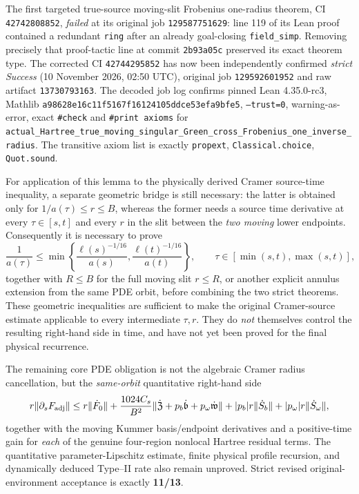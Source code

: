 \documentclass[11pt]{amsart}
\begin{document}
The first targeted true-source moving-slit Frobenius one-radius theorem,
CI \texttt{42742808852}, \emph{failed} at its original job
\texttt{129587751629}: line 119 of its Lean proof contained a
redundant \texttt{ring} after an already goal-closing
\texttt{field\_simp}. Removing precisely that proof-tactic line
at commit \texttt{2b93a05c} preserved its exact theorem type.
The corrected CI \texttt{42744295852} has now been independently
confirmed \emph{strict Success} (10 November 2026, 02:50 UTC),
original job \texttt{129592601952} and raw artifact
\texttt{13730793163}. The decoded job log confirms pinned
Lean 4.35.0-rc3, Mathlib
\texttt{a98628e16c11f5167f16124105ddce53efa9bfe5},
\texttt{--trust=0}, warning-as-error, exact \texttt{\#check}
and \texttt{\#print axioms} for
\texttt{actual\_Hartree\_true\_moving\_singular\_Green\_cross\_Frobenius\_one\_inverse\_radius}.
The transitive axiom list is exactly
\texttt{propext}, \texttt{Classical.choice}, \texttt{Quot.sound}.

For application of this lemma to the physically derived
Cramer source-time inequality, a separate geometric bridge is
still necessary: the latter is obtained only for
\(1/a(\tau)\le r\le B\), whereas the former needs a source
time derivative at every \(\tau\in[s,t]\) and every
\(r\) in the slit between the \emph{two moving} lower endpoints.
Consequently it is necessary to prove
\[
  \frac{1}{a(\tau)}
   \le \min\left\{
        \frac{\ell(s)^{-1/16}}{a(s)},
        \frac{\ell(t)^{-1/16}}{a(t)}
      \right\},\qquad
 \tau\in[\min(s,t),\max(s,t)],
\]
together with \(R\le B\) for the full moving slit
\(r\le R\), or another explicit annulus extension from the
same PDE orbit, before combining the two strict theorems.
These geometric inequalities are sufficient to make the
original Cramer-source estimate applicable to every intermediate
\(\tau,r\). They do \emph{not} themselves control the resulting
right-hand side in time, and have not yet been proved
for the final physical recurrence.

The remaining core PDE obligation is not the algebraic
Cramer radius cancellation, but the \emph{same-orbit} quantitative
right-hand side
\[
 r\|\partial_sF_{\rm adj}\|
 \le r\|\dot F_0\|+
    \frac{1024C_s}{B^2}
     \|\dot{\mathfrak Z}+p_b\dot{\mathfrak b}
       +p_\omega\dot{\mathfrak w}\|
   +|p_b|r\|\dot S_b\|+|p_\omega|r\|\dot S_\omega\|,
\]
together with the moving Kummer basis/endpoint derivatives and a
positive-time gain for \emph{each} of the genuine four-region nonlocal
Hartree residual terms. The quantitative parameter-Lipschitz estimate,
finite physical profile recursion, and dynamically deduced Type--II
rate also remain unproved. Strict revised original-environment
acceptance is exactly \textbf{11/13}.
\end{document}
